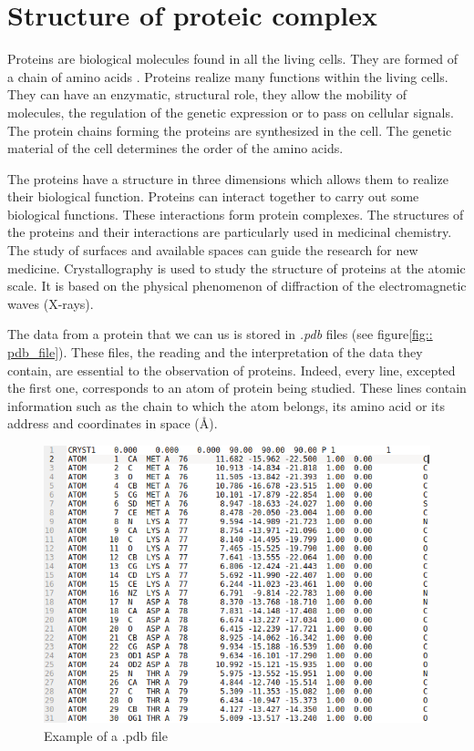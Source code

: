 \chapter{Structure of proteic complex}

Proteins are biological molecules found in all the living cells.
They are formed of a chain of amino acids \cite{Prot}.
Proteins realize many functions within the living cells.
They can have an enzymatic, structural role, they allow the mobility of molecules,
 the regulation of the genetic expression or to pass on cellular signals.
The protein chains forming the proteins are synthesized in the cell.
 The genetic material of the cell determines the order of the amino acids.

 The proteins have a structure in three dimensions which allows them
 to realize their biological function. Proteins can interact together to
 carry out some biological functions. These interactions form protein
  complexes. The structures of the proteins and their interactions are particularly used
   in medicinal chemistry.
 The study of surfaces and available spaces can guide the research for new medicine.
  Crystallography is used to study the structure of proteins at
   the atomic scale. It is based on the physical phenomenon of diffraction
    of the electromagnetic waves (X-rays).

The data from a protein that we can us is stored in \textit{.pdb} files
(see figure\ref{fig:: pdb_file}). These files, the reading and the interpretation
 of the data they contain, are essential to the observation of proteins.
 Indeed, every line, excepted the first one, corresponds to an atom of protein
 being studied.
These lines contain information such as the chain to which the atom belongs,
its amino acid or its address and coordinates in space ($\si{\angstrom}$).

\begin{figure}[ht]
  \includegraphics[width=\textwidth]{figures/pdb_example.png}
  \caption{Example of a .pdb file}
  \label{fig::pdb_file}
\end{figure}


